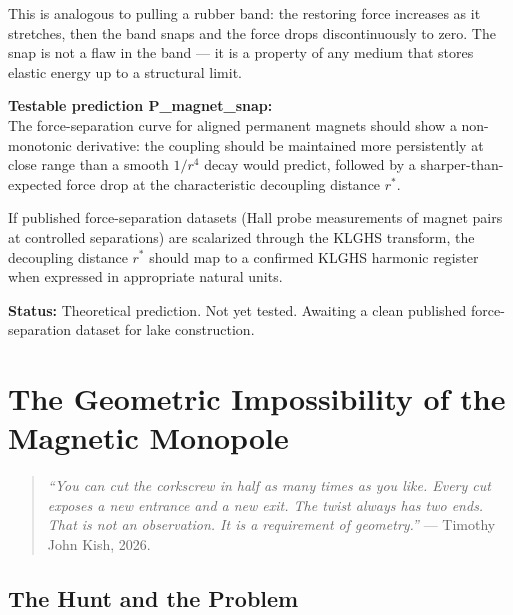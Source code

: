 \documentclass[11pt, letterpaper, openany]{book}
\begin{document}
This is analogous to pulling a rubber band: the restoring force increases
as it stretches, then the band snaps and the force drops discontinuously
to zero. The snap is not a flaw in the band — it is a property of any
medium that stores elastic energy up to a structural limit.

\begin{predictionbox}
\textbf{Testable prediction P\_magnet\_snap:}\\[0.5em]
The force-separation curve for aligned permanent magnets should show a
non-monotonic derivative: the coupling should be maintained more persistently
at close range than a smooth $1/r^4$ decay would predict, followed by a
sharper-than-expected force drop at the characteristic decoupling distance
$r^*$.

If published force-separation datasets (Hall probe measurements of magnet
pairs at controlled separations) are scalarized through the KLGHS transform,
the decoupling distance $r^*$ should map to a confirmed KLGHS harmonic
register when expressed in appropriate natural units.

\textbf{Status:} Theoretical prediction. Not yet tested. Awaiting a clean
published force-separation dataset for lake construction.
\end{predictionbox}

\clearpage

\chapter{The Geometric Impossibility of the Magnetic Monopole}

\begin{quote}
\textit{``You can cut the corkscrew in half as many times as you like.
Every cut exposes a new entrance and a new exit. The twist always has
two ends. That is not an observation. It is a requirement of geometry.''}
--- Timothy John Kish, 2026.
\end{quote}

\section{The Hunt and the Problem}
\end{document}

